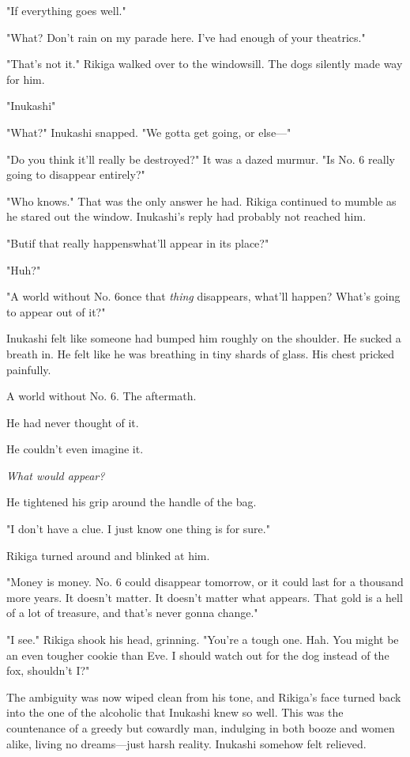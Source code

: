 "If everything goes well."

"What? Don't rain on my parade here. I've had enough of your theatrics."

"That's not it." Rikiga walked over to the windowsill. The dogs silently
made way for him.

"Inukashi\el "

"What?" Inukashi snapped. "We gotta get going, or else---"

"Do you think it'll really be destroyed?" It was a dazed murmur. "Is No.
6 really going to disappear entirely?"

"Who knows." That was the only answer he had. Rikiga continued to mumble
as he stared out the window. Inukashi's reply had probably not reached
him.

"But\el if that really happens\el what'll appear in its place?"

"Huh?"

"A world without No. 6\el once that \emph{thing} disappears, what'll happen?
What's going to appear out of it?"

Inukashi felt like someone had bumped him roughly on the shoulder. He
sucked a breath in. He felt like he was breathing in tiny shards of
glass. His chest pricked painfully.

A world without No. 6. The aftermath.

He had never thought of it.

He couldn't even imagine it.

\emph{What would appear?}

He tightened his grip around the handle of the bag.

"I don't have a clue. I just know one thing is for sure."

Rikiga turned around and blinked at him.

"Money is money. No. 6 could disappear tomorrow, or it could
last for a thousand more years. It doesn't matter. It doesn't matter
what appears. That gold is a hell of a lot of treasure, and that's never
gonna change."

"I see." Rikiga shook his head, grinning. "You're a tough one. Hah. You
might be an even tougher cookie than Eve. I should watch out for the dog
instead of the fox, shouldn't I?"

The ambiguity was now wiped clean from his tone, and Rikiga's face
turned back into the one of the alcoholic that Inukashi knew so well.
This was the countenance of a greedy but cowardly man, indulging in both
booze and women alike, living no dreams---just harsh reality. Inukashi
somehow felt relieved.

